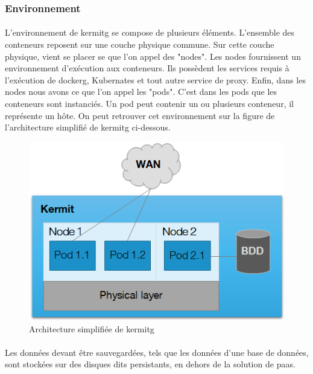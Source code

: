 \documentclass[12pt,a4paper]{report}
\begin{document}
\subsubsection{Environnement}
\paragraph*{}L'environnement de \gls{kermitg} se compose de plusieurs éléments. L'ensemble des conteneurs reposent sur une couche physique commune. Sur cette couche physique, vient se placer se que l'on appel des "nodes". Les nodes fournissent un environnement d'exécution aux conteneurs. Ils possèdent les services requis à l'exécution de \gls{dockerg}, Kubernates et tout autre service de proxy. Enfin, dans les nodes nous avons ce que l'on appel les "pods". C'est dans les pods que les conteneurs sont instanciés. Un pod peut contenir un ou plusieurs conteneur, il représente un hôte. On peut retrouver cet environnement sur la figure de l'architecture simplifié de \gls{kermitg} ci-dessous. 
\begin{figure}[!ht]
    \center
    \includegraphics[scale=0.86]{./img/archi_kermit.png}
    \caption{Architecture simplifiée de \gls{kermitg}}
\end{figure}
\paragraph*{}Les données devant être sauvegardées, tels que les données d'une base de données, sont stockées sur des disques dits persistants, en dehors de la solution de \gls{paas}.
\end{document}

